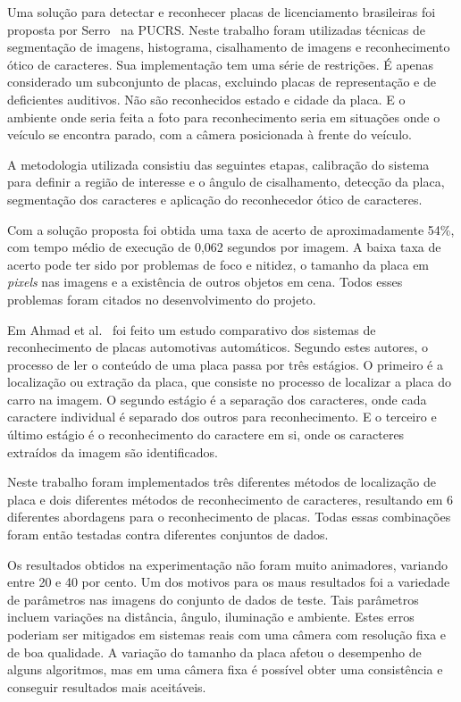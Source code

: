 Uma solução para detectar e reconhecer placas de licenciamento brasileiras foi
proposta por Serro~\cite{serro2012deteccao} na PUCRS\@. Neste trabalho foram
utilizadas técnicas de segmentação de imagens, histograma, cisalhamento de
imagens e reconhecimento ótico de caracteres. Sua implementação tem uma série de
restrições. É apenas considerado um subconjunto de placas, excluindo placas de
representação e de deficientes auditivos. Não são reconhecidos estado e cidade
da placa. E o ambiente onde seria feita a foto para reconhecimento seria em
situações onde o veículo se encontra parado, com a câmera posicionada à frente
do veículo.

A metodologia utilizada consistiu das seguintes etapas, calibração do sistema
para definir a região de interesse e o ângulo de cisalhamento, detecção da
placa, segmentação dos caracteres e aplicação do reconhecedor ótico de
caracteres.

Com a solução proposta foi obtida uma taxa de acerto de aproximadamente 54\%,
com tempo médio de execução de 0,062 segundos por imagem. A baixa taxa de acerto
pode ter sido por problemas de foco e nitidez, o tamanho da placa em
\emph{pixels} nas imagens e a existência de outros objetos em cena. Todos esses
problemas foram citados no desenvolvimento do projeto.

Em Ahmad et al.~\cite{ahmad2015automatic} foi feito um estudo comparativo dos
sistemas de reconhecimento de placas automotivas automáticos. Segundo estes
autores, o processo de ler o conteúdo de uma placa passa por três estágios. O
primeiro é a localização ou extração da placa, que consiste no processo de
localizar a placa do carro na imagem. O segundo estágio é a separação dos
caracteres, onde cada caractere individual é separado dos outros para
reconhecimento. E o terceiro e último estágio é o reconhecimento do caractere em
si, onde os caracteres extraídos da imagem são identificados.

Neste trabalho foram implementados três diferentes métodos de localização de
placa e dois diferentes métodos de reconhecimento de caracteres, resultando em 6
diferentes abordagens para o reconhecimento de placas. Todas essas combinações
foram então testadas contra diferentes conjuntos de dados.

Os resultados obtidos na experimentação não foram muito animadores, variando
entre 20 e 40 por cento. Um dos motivos para os maus resultados foi a variedade
de parâmetros nas imagens do conjunto de dados de teste. Tais parâmetros incluem
variações na distância, ângulo, iluminação e ambiente. Estes erros poderiam ser
mitigados em sistemas reais com uma câmera com resolução fixa e de boa
qualidade. A variação do tamanho da placa afetou o desempenho de alguns
algoritmos, mas em uma câmera fixa é possível obter uma consistência e conseguir
resultados mais aceitáveis.

